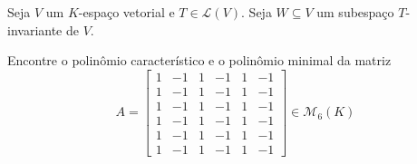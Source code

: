 \documentclass[11pt,a4paper]{article}
\begin{document}
\begin{exercicio}
 Seja $V$ um $K$-espaço vetorial e $T \in \mathcal{L}(V).$ Seja $W \subseteq V$ um subespaço $T$-invariante de $V.$
\end{exercicio}
\solucao{}
\begin{exercicio}
Encontre o polinômio característico e o polinômio minimal da matriz
\[
A = \begin{bmatrix}
1 & -1 & 1 & -1 & 1 & -1 \\
1 & -1 & 1 & -1 & 1 & -1 \\
1 & -1 & 1 & -1 & 1 & -1 \\
1 & -1 & 1 & -1 & 1 & -1 \\
1 & -1 & 1 & -1 & 1 & -1 \\
1 & -1 & 1 & -1 & 1 & -1
\end{bmatrix} \in \mathcal{M}_6(K)
\]
\end{exercicio}
\end{document}
